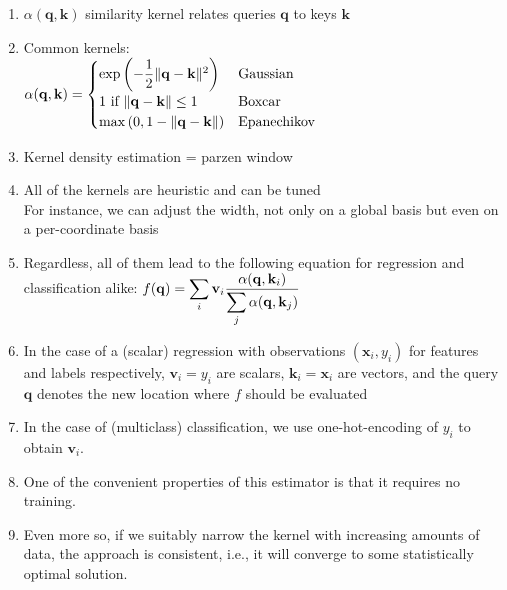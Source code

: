 \begin{enumerate}[itemsep=0.15cm]
    \item $\alpha(\mathbf{q}, \mathbf{k})$ similarity kernel relates queries $\mathbf{q}$ to keys $\mathbf{k}$
    
    \item Common kernels:\\
    $
        \alpha(\mathbf{q}, \mathbf{k}) = 
        \renewcommand{\arraystretch}{2}
        \begin{cases}
            \exp\left(-\dfrac{1}{2} \|\mathbf{q} - \mathbf{k}\|^2 \right) & \textrm{Gaussian} \\
            1 \textrm{ if } \|\mathbf{q} - \mathbf{k}\| \leq 1 & \textrm{Boxcar} \\
            \mathop{\mathrm{max}}\left(0, 1 - \|\mathbf{q} - \mathbf{k}\|\right) & \textrm{Epanechikov}    
        \end{cases}
        \renewcommand{\arraystretch}{1}
    $

    \item Kernel density estimation = parzen window

    \item All of the kernels are heuristic and can be tuned\\
    For instance, we can adjust the width, not only on a global basis but even on a per-coordinate basis

    \item Regardless, all of them lead to the following equation for regression and classification alike: $f(\mathbf{q}) = \displaystyle\sum_i \mathbf{v}_i \dfrac{\alpha(\mathbf{q}, \mathbf{k}_i)}{\displaystyle\sum_j \alpha(\mathbf{q}, \mathbf{k}_j)}$

    \item In the case of a (scalar) regression with observations $(\mathbf{x}_i, y_i)$ for features and labels respectively, $\mathbf{v}_i = y_i$ are scalars, $\mathbf{k}_i = \mathbf{x}_i$ are vectors, and the query $\mathbf{q}$ denotes the new location where $f$ should be evaluated

    \item In the case of (multiclass) classification, we use one-hot-encoding of $y_i$ to obtain $\mathbf{v}_i$. 
    
    \item One of the convenient properties of this estimator is that it requires no training. 
    
    \item Even more so, if we suitably narrow the kernel with increasing amounts of data, the approach is consistent, i.e., it will converge to some statistically optimal solution.


\end{enumerate}
